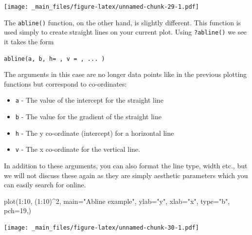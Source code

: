 \documentclass[
]{book}
\newenvironment{Shaded}{\begin{snugshade}}{\end{snugshade}}
\newcommand{\AttributeTok}[1]{\textcolor[rgb]{0.77,0.63,0.00}{#1}}
\newcommand{\DecValTok}[1]{\textcolor[rgb]{0.00,0.00,0.81}{#1}}
\newcommand{\FunctionTok}[1]{\textcolor[rgb]{0.00,0.00,0.00}{#1}}
\newcommand{\NormalTok}[1]{#1}
\newcommand{\SpecialCharTok}[1]{\textcolor[rgb]{0.00,0.00,0.00}{#1}}
\newcommand{\StringTok}[1]{\textcolor[rgb]{0.31,0.60,0.02}{#1}}
\providecommand{\tightlist}{%
  \setlength{\itemsep}{0pt}\setlength{\parskip}{0pt}}
\theoremstyle{definition}
\theoremstyle{definition}
\theoremstyle{definition}
\theoremstyle{definition}
\theoremstyle{remark}
\begin{document}
\texttt{[image: \_main\_files/figure-latex/unnamed-chunk-29-1.pdf]}

The \texttt{abline()} function, on the other hand, is slightly different. This function is used simply to create straight lines on your current plot. Using \texttt{?abline()} we see it takes the form

\texttt{abline(a,\ b,\ h=\ ,\ v\ =\ ,\ ...\ )}

The arguments in this case are no longer data points like in the previous plotting functions but correspond to co-ordinates:

\begin{itemize}
\tightlist
\item
  \texttt{a} - The value of the intercept for the straight line
\item
  \texttt{b} - The value for the gradient of the straight line
\item
  \texttt{h} - The y co-ordinate (intercept) for a horizontal line
\item
  \texttt{v} - The x co-ordinate for the vertical line.
\end{itemize}

In addition to these arguments, you can also format the line type, width etc., but we will not discuss these again as they are simply aesthetic parameters which you can easily search for online.

\begin{Shaded}
\begin{Highlighting}[]
\FunctionTok{plot}\NormalTok{(}\DecValTok{1}\SpecialCharTok{:}\DecValTok{10}\NormalTok{, (}\DecValTok{1}\SpecialCharTok{:}\DecValTok{10}\NormalTok{)}\SpecialCharTok{\^{}}\DecValTok{2}\NormalTok{,}
     \AttributeTok{main=}\StringTok{"Abline example"}\NormalTok{,}
     \AttributeTok{ylab=}\StringTok{"y"}\NormalTok{,}
     \AttributeTok{xlab=}\StringTok{"x"}\NormalTok{,}
     \AttributeTok{type=}\StringTok{"b"}\NormalTok{,}
     \AttributeTok{pch=}\DecValTok{19}\NormalTok{,)}
\end{Highlighting}
\end{Shaded}

\texttt{[image: \_main\_files/figure-latex/unnamed-chunk-30-1.pdf]}
\end{document}
